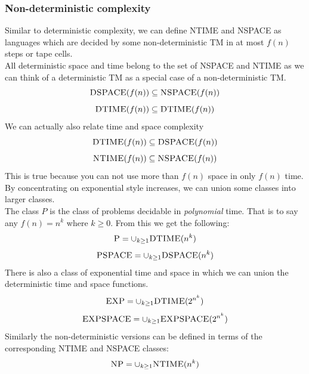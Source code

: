 \documentclass{article}
\theoremstyle{definition}
\newcommand{\n}[0]{\\[\baselineskip]}
\begin{document}
\subsubsection{Non-deterministic complexity}
Similar to deterministic complexity, we can define \textsc{NTIME} and \textsc{NSPACE} as languages which are decided by some non-deterministic TM in at most $f(n)$ steps or tape cells. 
\n
All deterministic space and time belong to the set of \textsc{NSPACE} and \textsc{NTIME} as we can think of a deterministic TM as a special case of a non-deterministic TM. 
\begin{equation}
\textsc{DSPACE}(f(n)) \subseteq \textsc{NSPACE}(f(n))
\end{equation}
\begin{equation}
\textsc{DTIME}(f(n)) \subseteq \textsc{DTIME}(f(n))
\end{equation}
We can actually also relate time and space complexity
\begin{equation}
\textsc{DTIME}(f(n)) \subseteq \textsc{DSPACE}(f(n))
\end{equation}
\begin{equation}
\textsc{NTIME}(f(n)) \subseteq \textsc{NSPACE}(f(n))
\end{equation}
This is true because you can not use more than $f(n)$ space in only $f(n)$ time. By concentrating on exponential style increases, we can union some classes into larger classes.
\n
The class $P$ is the class of problems decidable in \textit{polynomial} time. That is to say any $f(n) = n^k$ where $k \geq 0$. From this we get the following:
\begin{equation}
\textsc{P} = \cup_{k \geq 1}\textsc{DTIME}(n^k)
\end{equation}
\begin{equation}
\textsc{PSPACE} = \cup_{k \geq 1}\textsc{DSPACE}(n^k)
\end{equation}
There is also a class of exponential time and space in which we can union the deterministic time and space functions.
\begin{equation}
\textsc{EXP} = \cup_{k \geq 1}\textsc{DTIME}(2^{n^k})
\end{equation}
\begin{equation}
\textsc{EXPSPACE} = \cup_{k \geq 1}\textsc{EXPSPACE}(2^{n^k})
\end{equation}
Similarly the non-deterministic versions can be defined in terms of the corresponding \textsc{NTIME} and \textsc{NSPACE} classes:
\begin{equation}
\textsc{NP} = \cup_{k \geq 1}\textsc{NTIME}(n^k)
\end{equation}
\end{document}
